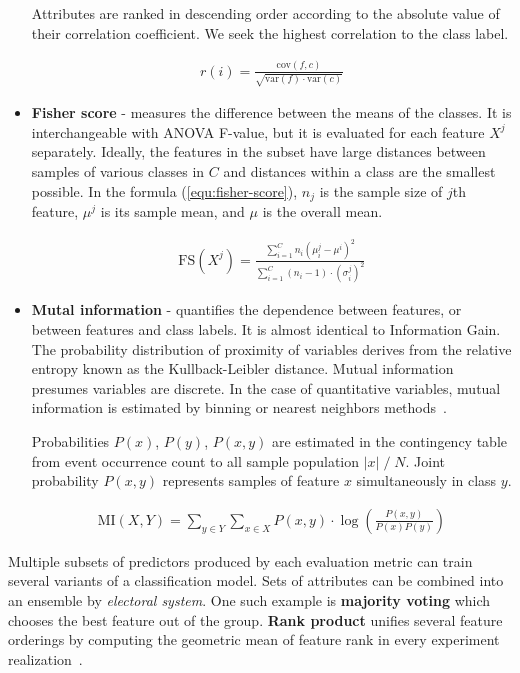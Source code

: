 \begin{itemize}
Attributes are ranked in descending order according to the absolute value of their correlation coefficient. We seek the highest correlation to the class label.

\begin{ceqn}\begin{align}
r(i) = \frac{\mathrm{cov}(f, c)}{\sqrt{\mathrm{var}(f) \cdot \mathrm{var}(c)}}
\end{align}\end{ceqn}


\item \textbf{Fisher score} - measures the difference between the means of the classes. It is interchangeable with ANOVA F-value, but it is evaluated for each feature $X^j$ separately. Ideally, the features in the subset have large distances between samples of various classes in $C$ and distances within a class are the smallest possible. In the formula (\ref{equ:fisher-score}), $n_j$ is the sample size of $j$th feature, $\mu^j$ is its sample mean, and $\mu$ is the overall mean.

\begin{ceqn}\begin{align}
\mathrm{FS}(X^j) = \frac{\sum_{i=1}^{C} n_i(\mu_i^j - \mu^i)^2}{\sum_{i=1}^{C} (n_i - 1) \cdot (\sigma_i^j)^2}
\label{equ:fisher-score}
\end{align}\end{ceqn}

\item \textbf{Mutal information} - quantifies the dependence between features, or between features and class labels. It is almost identical to Information Gain. The probability distribution of proximity of variables derives from the relative entropy known as the Kullback-Leibler distance. Mutual information presumes variables are discrete. In the case of quantitative variables, mutual information is estimated by binning or nearest neighbors methods~\cite{ross_mutual_2014}.

Probabilities $P(x)$, $P(y)$, $P(x, y)$ are estimated in the contingency table from event occurrence count to all sample population $|x|\;/\;N$. Joint probability $P(x, y)$ represents samples of feature $x$ simultaneously in class $y$.

\begin{ceqn}\begin{align}
\mathrm{MI}(X, Y) = \sum_{y \in Y} \sum_{x \in X} P(x, y) \cdot \log\left(\frac{P(x, y)}{P(x)P(y)}\right)
\end{align}\end{ceqn}
\end{itemize}

Multiple subsets of predictors produced by each evaluation metric can train several variants of a classification model. Sets of attributes can be combined into an ensemble by \emph{electoral system}. One such example is \textbf{majority voting} which chooses the best feature out of the group. \textbf{Rank product} unifies several feature orderings by computing the geometric mean of feature rank in every experiment realization~\cite{breitling_rank_2004}.